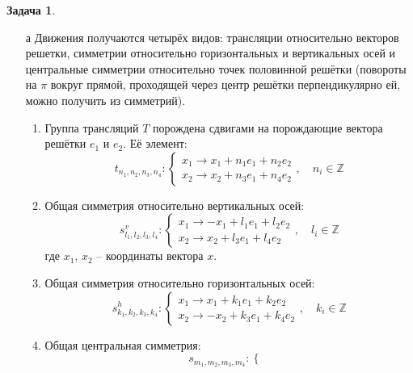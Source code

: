 \documentclass[12pt]{article}
\theoremstyle{definition}
\newtheorem{zad}{Задача}[section]
\begin{document}
\begin{zad}
\begin{itemize}
    \item[а] Движения получаются четырёх видов: трансляции относительно векторов решетки, симметрии относительно горизонтальных и вертикальных осей и центральные симметрии относительно точек половинной решётки (повороты на $\pi$ вокруг прямой, проходящей через центр решётки перпендикулярно ей, можно получить из симметрий).
    \begin{enumerate}
        \item Группа трансляций $T$ порождена сдвигами на порождающие вектора решётки $e_1$ и $e_2$. Её элемент:
        \begin{equation}
            t_{n_1,n_2,n_3,n_4}:\left\{
            \begin{array}{l}
            x_1 \rightarrow x_1+n_1e_1+n_2e_2\\
            x_2 \rightarrow x_2+n_3e_1+n_4e_2
            \end{array}
            \right.,\quad n_i\in\mathbb{Z}
        \end{equation}
        \item Общая симметрия относительно вертикальных осей:
        \begin{equation}
            s^v_{l_1,l_2,l_3,l_4}:\left\{
            \begin{array}{l}
            x_1 \rightarrow -x_1+l_1e_1+l_2e_2\\
            x_2 \rightarrow x_2+l_3e_1+l_4e_2
            \end{array}
            \right.,\quad l_i\in\mathbb{Z}
        \end{equation}
        где $x_1$, $x_2$ -- координаты вектора $x$.
       \item Общая симметрия относительно горизонтальных осей:
        \begin{equation}
            s^h_{k_1,k_2,k_3,k_4}:\left\{
            \begin{array}{l}
            x_1 \rightarrow x_1+k_1e_1+k_2e_2\\
            x_2 \rightarrow -x_2+k_3e_1+k_4e_2
            \end{array}
            \right.,\quad k_i\in\mathbb{Z}
        \end{equation}
        \item Общая центральная симметрия:
        \begin{equation}
            s_{m_1,m_2,m_3,m_4}: \left\{
            \begin{array}{l}

\end{array}
\end{equation}
\end{enumerate}
\end{itemize}
\end{zad}
\end{document}
